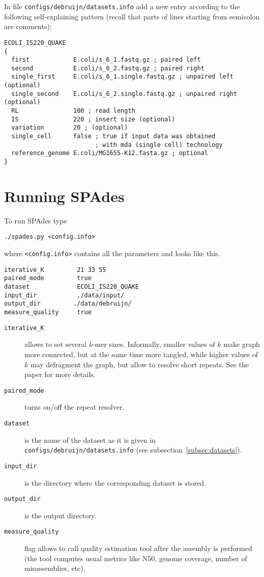 \documentclass{article}
\def\spades{SPAdes}
\begin{document}
In file {\tt configs/debruijn/datasets.info} add a new entry according to the following self-explaining pattern (recall that parts of lines starting from
semicolon are comments):{}
\begin{lstlisting}
ECOLI_IS220_QUAKE
{
  first            E.coli/s_6_1.fastq.gz ; paired left
  second           E.coli/s_6_2.fastq.gz ; paired right
  single_first     E.coli/s_6_1.single.fastq.gz ; unpaired left (optional)
  single_second    E.coli/s_6_2.single.fastq.gz ; unpaired right (optional)
  RL               100 ; read length
  IS               220 ; insert size (optional)
  variation        20 ; (optional)
  single_cell      false ; true if input data was obtained 
                         ; with mda (single cell) technology
  reference_genome E.coli/MG1655-K12.fasta.gz ; optional
}
\end{lstlisting}

\section{Running {\spades}}
To run {\spades} type
\begin{lstlisting}
./spades.py <config.info>
\end{lstlisting}
where {\tt <config.info>} contains all the parameters and looks like this.
\begin{lstlisting}
iterative_K         21 33 55
paired_mode         true 
dataset             ECOLI_IS220_QUAKE
input_dir           ./data/input/
output_dir         ./data/debruijn/
measure_quality     true
\end{lstlisting}

\begin{description}
\item[{\tt iterative\_K}] allows to set several $k$-mer sizes. Informally, smaller values of $k$ make graph more connected,
but at the same time more tangled, while higher values of $k$ may defragment the graph, but allow to resolve short repeats.
See the paper for more details.
\item[{\tt paired\_mode}] turns on/off the repeat resolver.
\item[{\tt dataset}] is the name of the dataset as it is given in {\tt configs/debruijn/datasets.info} (see subsection~\ref{subsec:datasets}).
\item[{\tt input\_dir}] is the directory where the corresponding dataset is stored.
\item[{\tt output\_dir}] is the output directory.
\item[{\tt measure\_quality}] flag allows to call quality estimation tool after the assembly is performed (the tool computes usual
metrics like N50, genome coverage, number of misassemblies, etc).
\end{description}
\end{document}
